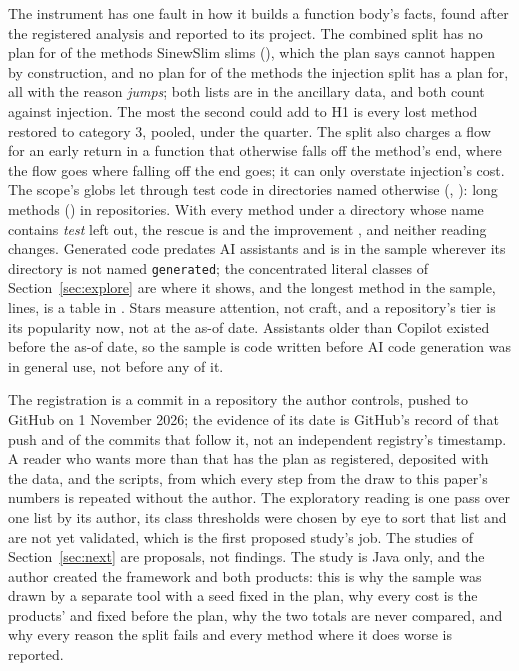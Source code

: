 \documentclass[11pt,a4paper]{article}
\newcommand{\sig}[1]{\texttt{#1}}
\newcommand{\Hone}{H1}
\begin{document}
The instrument has one fault in how it builds a function body's facts, found
after the registered analysis and reported to its project. The combined
split has no plan for \nExceptions{} of the \nSlims{} methods SinewSlim slims
(\exceptionsShare{}), which the plan says cannot happen by construction, and
no plan for \nCatThreeLost{} of the \catThree{} methods the injection split
has a plan for, all with the reason \emph{jumps}; both lists are in the
ancillary data, and both count against injection. The most the second could
add to \Hone{} is every lost method restored to category 3,
\catThreeCRestoredShare{} pooled, under the quarter. The split also charges
a flow for an early return in a function that otherwise falls off the
method's end, where the flow goes where falling off the end goes; it can
only overstate injection's cost. The scope's globs let through test code in
directories named otherwise (\sig{\testTopSegment},
\sig{\testSecondSegment}): \testDroppedLong{} long methods
(\testDroppedLongShare{}) in \testRepos{} repositories. With every method
under a directory whose name contains \emph{test} left out, the rescue is
\testHOneCi{} and the improvement \testHTwoCi{}, and neither reading
changes. Generated code predates AI assistants and is in the sample wherever
its directory is not named \sig{generated}; the concentrated literal classes
of Section~\ref{sec:explore} are where it shows, and the longest method in
the sample, \longestMethodLines{} lines, is a table in
\sig{\longestMethodRepo}. Stars measure attention, not craft, and a
repository's tier is its popularity now, not at the as-of date. Assistants
older than Copilot existed before the as-of date, so the sample is code
written before AI code generation was in general use, not before any of it.

The registration is a commit in a repository the author controls, pushed to
GitHub on 1 November 2026; the evidence of its date is GitHub's record of
that push and of the commits that follow it, not an independent registry's
timestamp. A reader who wants more than that has the plan as registered,
deposited with the data, and the scripts, from which every step from the
draw to this paper's numbers is repeated without the author. The exploratory reading
is one pass over one list by its author, its class thresholds were chosen by
eye to sort that list and are not yet validated, which is the first
proposed study's job. The studies of Section~\ref{sec:next} are proposals,
not findings. The study is Java only, and
the author created the framework and both products: this is why the sample
was drawn by a separate tool with a seed fixed in the plan, why every cost
is the products' and fixed before the plan, why the two totals are never
compared, and why every reason the split fails and every method where it
does worse is reported.
\end{document}

